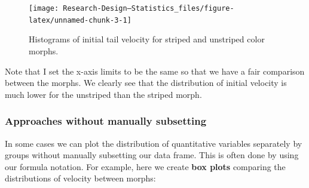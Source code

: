 \documentclass[
]{book}
\newenvironment{Shaded}{\begin{snugshade}}{\end{snugshade}}
\newcommand{\AttributeTok}[1]{\textcolor[rgb]{0.13,0.29,0.53}{#1}}
\newcommand{\DecValTok}[1]{\textcolor[rgb]{0.00,0.00,0.81}{#1}}
\newcommand{\FunctionTok}[1]{\textcolor[rgb]{0.13,0.29,0.53}{\textbf{#1}}}
\newcommand{\NormalTok}[1]{#1}
\newcommand{\SpecialCharTok}[1]{\textcolor[rgb]{0.81,0.36,0.00}{\textbf{#1}}}
\newcommand{\StringTok}[1]{\textcolor[rgb]{0.31,0.60,0.02}{#1}}
\begin{document}
\begin{Shaded}
\end{Shaded}

\begin{figure}
\texttt{[image: Research-Design---Statistics\_files/figure-latex/unnamed-chunk-3-1]} \caption{Histograms of initial tail velocity for striped and unstriped color morphs.}\label{fig:unnamed-chunk-3}
\end{figure}

Note that I set the x-axis limits to be the same so that we have a fair comparison between the morphs. We clearly see that the distribution of initial velocity is much lower for the unstriped than the striped morph.

\subsubsection{Approaches without manually subsetting}\label{approaches-without-manually-subsetting}

In some cases we can plot the distribution of quantitative variables separately by groups without manually subsetting our data frame. This is often done by using our formula notation. For example, here we create \textbf{box plots} comparing the distributions of velocity between morphs:
\end{document}
